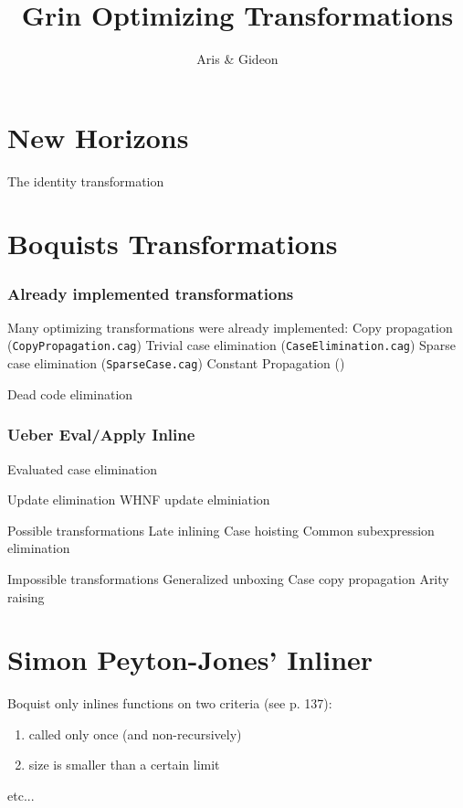 \documentclass{beamer}
\title[GRIN]{Grin Optimizing Transformations}
\author[]{Aris \& Gideon}
\institute[]{Efficient Implementation of Functional Languages Seminar 2006}
\begin{document}
\section{New Horizons}
\begin{frame}
The identity transformation
\end{frame}

\section{Boquists Transformations}
\begin{frame}
\frametitle{Already implemented transformations}
Many optimizing transformations were already implemented:
Copy propagation (\texttt{CopyPropagation.cag})
Trivial case elimination (\texttt{CaseElimination.cag})
Sparse case elimination (\texttt{SparseCase.cag})
Constant Propagation (\texttt{})

Dead code elimination

\end{frame}

\begin{frame}
\frametitle{Ueber Eval/Apply Inline}
Evaluated case elimination

Update elimination
WHNF update elminiation
\end{frame}

\begin{frame}

Possible transformations
Late inlining
Case hoisting
Common subexpression elimination

Impossible transformations
Generalized unboxing
Case copy propagation
Arity raising

\end{frame}

\section{Simon Peyton-Jones' Inliner}
\begin{frame}
Boquist only inlines functions on two criteria (see p. 137):
\begin{enumerate}
\item called only once (and non-recursively)
\item size is smaller than a certain limit
\end{enumerate}

etc...
\end{frame}
\end{document}
